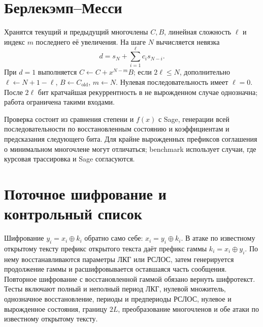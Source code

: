 \documentclass[12pt]{ca-capstone}
\begin{document}
\section{Берлекэмп--Месси}
Хранятся текущий и предыдущий многочлены $C,B$, линейная сложность $\ell$ и индекс $m$ последнего
её увеличения. На шаге $N$ вычисляется невязка
\[
 d=s_N+\sum_{i=1}^{\ell}c_i s_{N-i}.
\]
При $d=1$ выполняется $C\gets C+x^{N-m}B$; если $2\ell\le N$, дополнительно
$\ell\gets N+1-\ell$, $B\gets C_{\mathrm{old}}$, $m\gets N$. Нулевая последовательность имеет
$\ell=0$. После $2\ell$ бит кратчайшая рекуррентность в не вырожденном случае однозначна;
работа ограничена такими входами.

Проверка состоит из сравнения степени и $f(x)$ с Sage, генерации всей последовательности по
восстановленным состоянию и коэффициентам и предсказания следующего бита. Для крайне вырожденных
префиксов соглашения о минимальном многочлене могут отличаться; benchmark использует случаи, где
курсовая трассировка и Sage согласуются.

\clearpage
\section{Поточное шифрование и контрольный список}
Шифрование $y_i=x_i\oplus k_i$ обратно само себе: $x_i=y_i\oplus k_i$. В атаке по известному
открытому тексту префикс открытого текста даёт префикс гаммы $k_i=x_i\oplus y_i$. По нему
восстанавливаются параметры ЛКГ или РСЛОС, затем генерируется продолжение гаммы и расшифровывается
оставшаяся часть сообщения. Повторное шифрование с восстановленной гаммой обязано вернуть
шифротекст. Тесты включают полный и неполный период ЛКГ, нулевой множитель, однозначное
восстановление, периоды и предпериоды РСЛОС, нулевое и вырожденное состояния, границу $2L$,
преобразование многочленов и обе атаки по известному открытому тексту.

\end{document}
